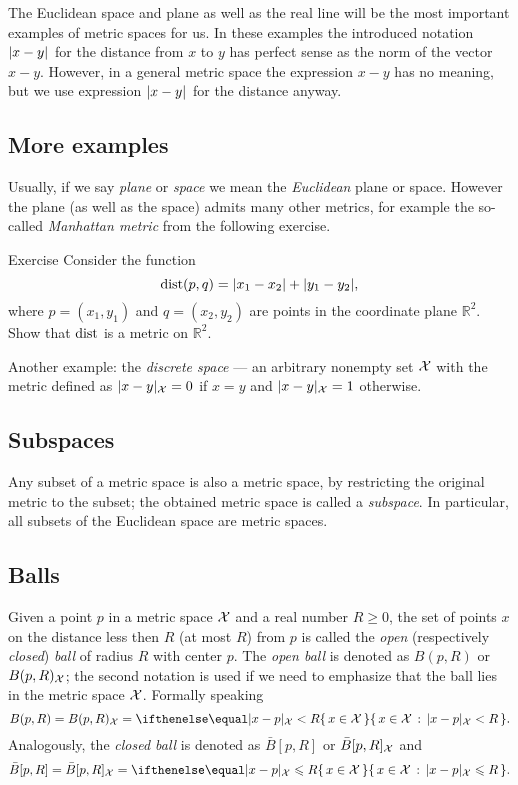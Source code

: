 The Euclidean space and plane as well as the real line will be the most important examples of metric spaces for us.
In these examples the introduced notation $\dist{x}{y}{}$ for the distance from $x$ to $y$ has perfect sense as the norm of the vector $x-y$.
However, in a general metric space the expression $x-y$ has no meaning, but we use expression $\dist{x}{y}{}$ for the distance anyway.

\subsection*{More examples}

Usually, if we say {}\emph{plane} or {}\emph{space} we mean the {}\emph{Euclidean} plane or space.
However the plane (as well as the space) admits many other metrics, for example the so-called {}\emph{Manhattan metric} from the following exercise.

\begin{thm}{Exercise}\label{ex:ell-infty}
Consider the function
$$\mathop{\rm dist}\nolimits(p,q)=|x_1-x_2|+|y_1-y_2|,$$
where $p=(x_1,y_1)$ and $q=(x_2,y_2)$ are points in the coordinate plane $\mathbb{R}^2$.
Show that $\mathop{\rm dist}\nolimits$ is a metric on $\mathbb{R}^2$.
\end{thm}

Another example: the {}\emph{discrete space} --- an arbitrary nonempty set $\mathcal{X}$ with the metric defined as $\dist{x}{y}{\spc{X}}=0$ if $x=y$ and $\dist{x}{y}{\spc{X}}=1$ otherwise.

\subsection*{Subspaces}
Any subset of a metric space is also a metric space, by restricting the original metric to the subset;
the obtained metric space is called a {}\emph{subspace}.
In particular, all subsets of the Euclidean space are metric spaces.

\subsection*{Balls}
Given a point $p$ in a metric space $\mathcal{X}$ and a real number $R\ge 0$, the set of points $x$ on the distance less then $R$ (at most $R$) from $p$ is called the \emph{open} (respectively \emph{closed}) {}\emph{ball} of radius $R$ with center $p$.
The {}\emph{open ball} is denoted as $B(p,R)$ or $B(p,R)_{\mathcal{X}}$;
the second notation is used if we need to emphasize that the ball lies in the metric space $\mathcal{X}$.
Formally speaking
\[B(p,R)=B(p,R)_{\spc{X}}=\set{x\in \spc{X}}{\dist{x}{p}{\spc{X}}< R}.\]
Analogously, the {}\emph{closed ball} is denoted as $\bar B[p,R]$ or $\bar B[p,R]_{\mathcal{X}}$ and
\[\bar B[p,R]=\bar B[p,R]_{\spc{X}}=\set{x\in \spc{X}}{\dist{x}{p}{\spc{X}}\le R}.\]

